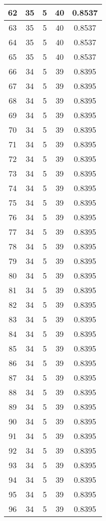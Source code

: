 \documentclass[letterpaper, 12pt]{article}
\begin{document}
\begin{longtable}{|c|c|c|c|c|}
\hline
62 & 35 & 5 & 40 & 0.8537 \\
\hline
63 & 35 & 5 & 40 & 0.8537 \\
\hline
64 & 35 & 5 & 40 & 0.8537 \\
\hline
65 & 35 & 5 & 40 & 0.8537 \\
\hline
66 & 34 & 5 & 39 & 0.8395 \\
\hline
67 & 34 & 5 & 39 & 0.8395 \\
\hline
68 & 34 & 5 & 39 & 0.8395 \\
\hline
69 & 34 & 5 & 39 & 0.8395 \\
\hline
70 & 34 & 5 & 39 & 0.8395 \\
\hline
71 & 34 & 5 & 39 & 0.8395 \\
\hline
72 & 34 & 5 & 39 & 0.8395 \\
\hline
73 & 34 & 5 & 39 & 0.8395 \\
\hline
74 & 34 & 5 & 39 & 0.8395 \\
\hline
75 & 34 & 5 & 39 & 0.8395 \\
\hline
76 & 34 & 5 & 39 & 0.8395 \\
\hline
77 & 34 & 5 & 39 & 0.8395 \\
\hline
78 & 34 & 5 & 39 & 0.8395 \\
\hline
79 & 34 & 5 & 39 & 0.8395 \\
\hline
80 & 34 & 5 & 39 & 0.8395 \\
\hline
81 & 34 & 5 & 39 & 0.8395 \\
\hline
82 & 34 & 5 & 39 & 0.8395 \\
\hline
83 & 34 & 5 & 39 & 0.8395 \\
\hline
84 & 34 & 5 & 39 & 0.8395 \\
\hline
85 & 34 & 5 & 39 & 0.8395 \\
\hline
86 & 34 & 5 & 39 & 0.8395 \\
\hline
87 & 34 & 5 & 39 & 0.8395 \\
\hline
88 & 34 & 5 & 39 & 0.8395 \\
\hline
89 & 34 & 5 & 39 & 0.8395 \\
\hline
90 & 34 & 5 & 39 & 0.8395 \\
\hline
91 & 34 & 5 & 39 & 0.8395 \\
\hline
92 & 34 & 5 & 39 & 0.8395 \\
\hline
93 & 34 & 5 & 39 & 0.8395 \\
\hline
94 & 34 & 5 & 39 & 0.8395 \\
\hline
95 & 34 & 5 & 39 & 0.8395 \\
\hline
96 & 34 & 5 & 39 & 0.8395 \\

\end{longtable}
\end{document}
